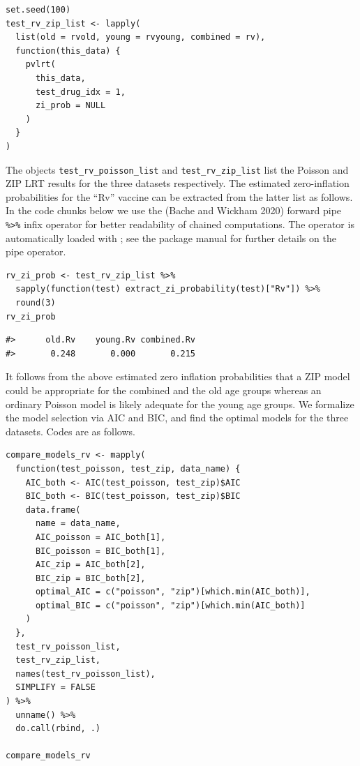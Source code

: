 \begin{verbatim}
set.seed(100)
test_rv_zip_list <- lapply(
  list(old = rvold, young = rvyoung, combined = rv),
  function(this_data) {
    pvlrt(
      this_data,
      test_drug_idx = 1,
      zi_prob = NULL
    )
  }
)
\end{verbatim}

The objects \texttt{test\_rv\_poisson\_list} and \texttt{test\_rv\_zip\_list} list the Poisson and ZIP LRT results for the three datasets respectively. The estimated zero-inflation probabilities for the ``Rv'' vaccine can be extracted from the latter list as follows. In the code chunks below we use the  (Bache and Wickham 2020) forward pipe \texttt{\%\textgreater{}\%} infix operator for better readability of chained computations. The operator is automatically loaded with ; see the  package manual for further details on the pipe operator.

\begin{verbatim}
rv_zi_prob <- test_rv_zip_list %>% 
  sapply(function(test) extract_zi_probability(test)["Rv"]) %>% 
  round(3)
rv_zi_prob
\end{verbatim}

\begin{verbatim}
#>      old.Rv    young.Rv combined.Rv 
#>       0.248       0.000       0.215
\end{verbatim}

It follows from the above estimated zero inflation probabilities that a ZIP model could be appropriate for the combined and the old age groups whereas an ordinary Poisson model is likely adequate for the young age groups. We formalize the model selection via AIC and BIC, and find the optimal models for the three datasets. Codes are as follows.

\begin{verbatim}
compare_models_rv <- mapply(
  function(test_poisson, test_zip, data_name) {
    AIC_both <- AIC(test_poisson, test_zip)$AIC
    BIC_both <- BIC(test_poisson, test_zip)$BIC
    data.frame(
      name = data_name, 
      AIC_poisson = AIC_both[1],
      BIC_poisson = BIC_both[1],
      AIC_zip = AIC_both[2],
      BIC_zip = BIC_both[2],
      optimal_AIC = c("poisson", "zip")[which.min(AIC_both)],
      optimal_BIC = c("poisson", "zip")[which.min(AIC_both)]
    )
  },
  test_rv_poisson_list,
  test_rv_zip_list,
  names(test_rv_poisson_list),
  SIMPLIFY = FALSE
) %>% 
  unname() %>% 
  do.call(rbind, .)

compare_models_rv
\end{verbatim}

